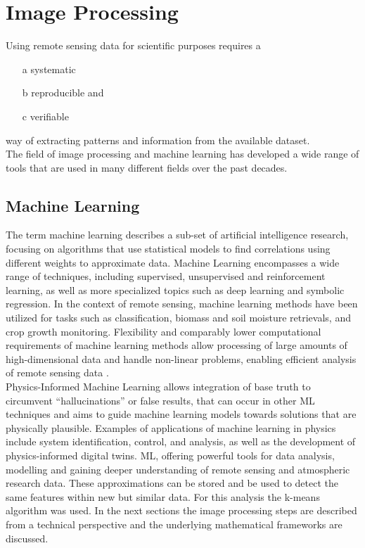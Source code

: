 \documentclass[12pt,a4paper, english,twoside]{scrartcl}
\begin{document}
\section{Image Processing}\label{sec:imgProcessing}
    Using remote sensing data for scientific purposes requires a 
    \begin{itemize} \setlength\itemsep{0.2cm}
      \item[a] systematic
      \item[b] reproducible and 
      \item[c] verifiable 
    \end{itemize}%
    way of extracting patterns and information from the available dataset.\\
    The field of image processing and machine learning has developed a wide range of tools that are used in many different fields over the past decades. 
    \subsection{Machine Learning}\label{sec:ml}
      The term machine learning describes a sub-set of artificial intelligence research, focusing on algorithms that use statistical models to find correlations using different weights to approximate data.
      Machine Learning encompasses a wide range of techniques, including supervised, unsupervised and reinforcement learning, as well as more specialized topics such as deep learning and symbolic regression\autocite{Rodrigues2023}. 
      In the context of remote sensing, machine learning methods have been utilized for tasks such as classification, biomass and soil moisture retrievals, and crop growth monitoring.
      Flexibility and comparably lower computational requirements of machine learning methods allow processing of large amounts of high-dimensional data and handle non-linear problems, enabling efficient analysis of remote sensing data \autocite{Maxwell2018}.\\
      Physics-Informed Machine Learning allows integration of base truth to circumvent ``hallucinations'' or false results, that can occur in other \gls{ML} techniques and aims to guide machine learning models towards solutions that are physically plausible.
      Examples of applications of machine learning in physics include system identification, control, and analysis, as well as the development of physics-informed digital twins. 
      \gls{ML}, offering powerful tools for data analysis, modelling and gaining deeper understanding of remote sensing and atmospheric research data.
      These approximations can be stored and be used to detect the same features within new but similar data.
      For this analysis the k-means algorithm was used. 
      In the next sections the image processing steps are described from a technical perspective and the underlying mathematical frameworks are discussed.
\end{document}
